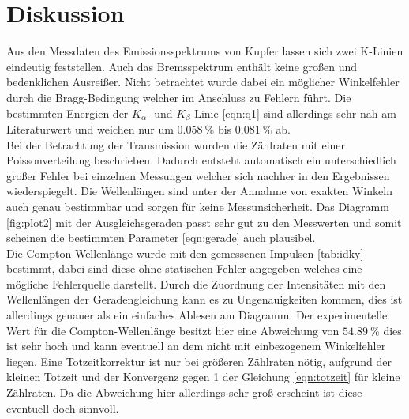 \section{Diskussion}

Aus den Messdaten des Emissionsspektrums von Kupfer lassen sich zwei K-Linien eindeutig feststellen. Auch das Bremsspektrum enthält keine großen und bedenklichen Ausreißer.
Nicht betrachtet wurde dabei ein möglicher Winkelfehler durch die Bragg-Bedingung welcher im Anschluss zu Fehlern führt. Die bestimmten Energien
der $K_{\alpha}$- und $K_{\beta}$-Linie \eqref{eqn:q1} sind allerdings sehr nah am Literaturwert und weichen nur um $\SI{0.058}{\percent}$ bis $\SI{0.081}{\percent}$ ab.
\\
\newline
Bei der Betrachtung der Transmission wurden die Zählraten mit einer Poissonverteilung beschrieben. Dadurch entsteht automatisch ein unterschiedlich großer Fehler
bei einzelnen Messungen welcher sich nachher in den Ergebnissen wiederspiegelt. Die Wellenlängen sind unter der Annahme von exakten Winkeln auch genau bestimmbar und sorgen für
keine Messunsicherheit. Das Diagramm \ref{fig:plot2} mit der Ausgleichsgeraden passt sehr gut zu den Messwerten und somit scheinen die bestimmten Parameter \eqref{eqn:gerade} auch plausibel.
\\
\newline
Die Compton-Wellenlänge wurde mit den gemessenen Impulsen \ref{tab:idky} bestimmt, dabei sind diese ohne statischen Fehler angegeben welches eine mögliche Fehlerquelle darstellt.
Durch die Zuordnung der Intensitäten mit den Wellenlängen der Geradengleichung kann es zu Ungenauigkeiten kommen, dies ist allerdings genauer als ein einfaches Ablesen am Diagramm.
Der experimentelle Wert für die Compton-Wellenlänge besitzt hier eine Abweichung von $\SI{54.89}{\percent}$ dies ist sehr hoch und kann eventuell an dem nicht mit einbezogenem Winkelfehler liegen.
Eine Totzeitkorrektur ist nur bei größeren Zählraten nötig, aufgrund der kleinen Totzeit und der Konvergenz gegen 1 der Gleichung \eqref{eqn:totzeit} für kleine Zählraten. Da die Abweichung hier allerdings sehr groß erscheint
ist diese eventuell doch sinnvoll.

